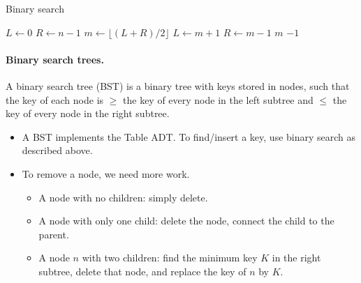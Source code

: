 \begin{algorithm}[H]
  \caption{Binary search
    \label{alg:binsearch}}
\begin{algorithmic}[1]
	\State $L \gets 0$
	\State $R \gets n-1$
		\State $m \gets \lfloor (L+R)/2\rfloor$ 
			\State $L\gets m+1$
			\State $R\gets m-1$
		\Else 
			\State \Return $m$ 
		\EndIf
	\EndWhile
	\Return $-1$ 
\EndFunction
\end{algorithmic}
\end{algorithm}

\paragraph{Binary search trees.}
\begin{Definition}
A \alert{binary search tree} (BST) is a binary tree with keys stored in nodes, 
such that the key of each node is $\geq$ the key of every node in the left subtree and $\leq$ 
the key of  every node in the right subtree.
\end{Definition}

\begin{itemize}
\item A BST implements the Table ADT. To find/insert a key, use binary search as 
described above.
\item To remove a node, we need more work.
\begin{itemize}
\item A node with no children: simply delete.
\item A node with only one child: delete the node, connect the child 
to the parent.
\item A node $n$ with two children: find the minimum key $K$ in the 
right subtree, delete that node, and replace the key of $n$ by $K$.
\end{itemize}
\end{itemize}


